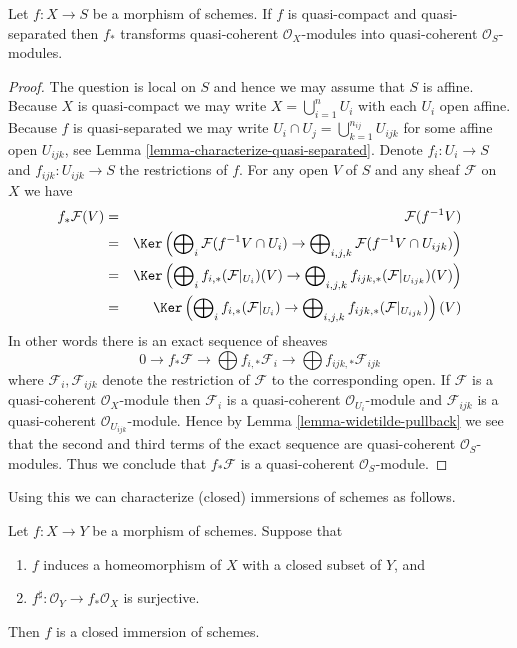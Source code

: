 \begin{lemma}
\label{lemma-push-forward-quasi-coherent}
Let $f : X \to S$ be a morphism of schemes.
If $f$ is quasi-compact and quasi-separated then
$f_*$ transforms quasi-coherent $\mathcal{O}_X$-modules
into quasi-coherent $\mathcal{O}_S$-modules.
\end{lemma}

\begin{proof}
The question is local on $S$ and hence we may assume that
$S$ is affine. Because $X$ is quasi-compact we may write
$X = \bigcup_{i = 1}^n U_i$ with each $U_i$ open affine.
Because $f$ is quasi-separated we may write
$U_i \cap U_j = \bigcup_{k = 1}^{n_{ij}} U_{ijk}$ for some
affine open $U_{ijk}$, see Lemma \ref{lemma-characterize-quasi-separated}.
Denote $f_i : U_i \to S$ and $f_{ijk} : U_{ijk} \to S$ the
restrictions of $f$. For any open $V$ of $S$ and any sheaf
$\mathcal{F}$ on $X$ we have
\begin{eqnarray*}
f_*\mathcal{F}(V) & = & \mathcal{F}(f^{-1}V) \\
& = &
\Ker\left(
\bigoplus\nolimits_i \mathcal{F}(f^{-1}V \cap U_i)
\to
\bigoplus\nolimits_{i, j, k} \mathcal{F}(f^{-1}V \cap U_{ijk})\right) \\
& = &
\Ker\left(
\bigoplus\nolimits_i f_{i, *}(\mathcal{F}|_{U_i})(V)
\to
\bigoplus\nolimits_{i, j, k} f_{ijk, *}(\mathcal{F}|_{U_{ijk}})(V)\right) \\
& = &
\Ker\left(
\bigoplus\nolimits_i f_{i, *}(\mathcal{F}|_{U_i})
\to
\bigoplus\nolimits_{i, j, k} f_{ijk, *}(\mathcal{F}|_{U_{ijk}})\right)(V)
\end{eqnarray*}
In other words there is an exact sequence of sheaves
$$
0 \to f_*\mathcal{F}
\to \bigoplus f_{i, *}\mathcal{F}_i
\to \bigoplus f_{ijk, *}\mathcal{F}_{ijk}
$$
where $\mathcal{F}_i, \mathcal{F}_{ijk}$ denote the
restriction of $\mathcal{F}$ to the corresponding open.
If $\mathcal{F}$ is a quasi-coherent $\mathcal{O}_X$-module
then $\mathcal{F}_i$ is a quasi-coherent $\mathcal{O}_{U_i}$-module
and $\mathcal{F}_{ijk}$ is a quasi-coherent $\mathcal{O}_{U_{ijk}}$-module.
Hence by Lemma \ref{lemma-widetilde-pullback} we see that the second and
third terms of the exact sequence are quasi-coherent
$\mathcal{O}_S$-modules. Thus we conclude that
$f_*\mathcal{F}$ is a quasi-coherent $\mathcal{O}_S$-module.
\end{proof}

\noindent
Using this we can characterize (closed) immersions of schemes
as follows.

\begin{lemma}
\label{lemma-characterize-closed-immersions}
Let $f : X \to Y$ be a morphism of schemes.
Suppose that
\begin{enumerate}
\item $f$ induces a homeomorphism of $X$ with a
closed subset of $Y$, and
\item $f^\sharp : \mathcal{O}_Y \to f_*\mathcal{O}_X$
is surjective.
\end{enumerate}
Then $f$ is a closed immersion of schemes.
\end{lemma}

